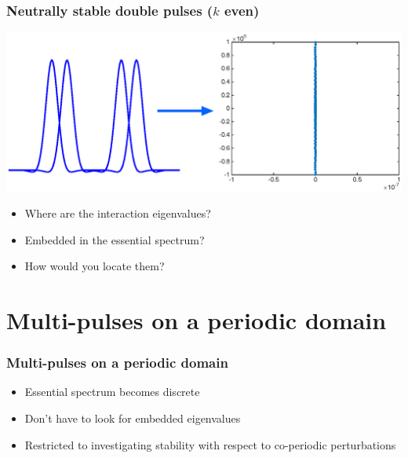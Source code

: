 \documentclass[16pt]{beamer}
\begin{document}
\begin{frame}
	\frametitle{Neutrally stable double pulses ($k$ even)}
	\begin{center}
		\includegraphics[width=1\linewidth]{images/doublestableeig}
	\end{center}
	\begin{itemize}
	\item Where are the interaction eigenvalues?
	\item Embedded in the essential spectrum?
	\item How would you locate them?
	\end{itemize}
\end{frame}

\section{Multi-pulses on a periodic domain}

\begin{frame}
	\frametitle{Multi-pulses on a periodic domain}

	\begin{itemize}
		\item Essential spectrum becomes discrete
		\vspace{0.5cm}
		\item Don't have to look for embedded eigenvalues
		\vspace{0.5cm}
		\item Restricted to investigating stability with respect to co-periodic perturbations
	\end{itemize}
\end{frame}
\end{document}
